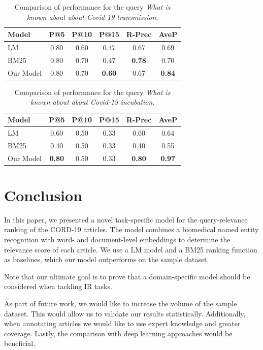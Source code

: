 \documentclass[10pt, a4paper]{article}
\begin{document}
	\begin{table}
		\caption{Comparison of performance for the query \textit{What is known about about Covid-19 transmission}.}
		\label{tab:query1}
		\begin{center}
			\begin{tabular}{lccccc}
				\toprule
				Model & P@5 & P@10 & P@15 & R-Prec & AveP \\
				\midrule
				LM & 0.80 & 0.60 & 0.47 & 0.67 & 0.69  \\
				BM25 & 0.80 & 0.70 & 0.47 & \textbf{0.78} & 0.70 \\
				Our Model & 0.80 & 0.70 & \textbf{0.60} & 0.67 & \textbf{0.84} \\
				\bottomrule
			\end{tabular}
		\end{center}
	\end{table}
	
	\begin{table}
		\caption{Comparison of performance for the query \textit{What is known about about Covid-19 incubation}.}
		\label{tab:query2}
		\begin{center}
			\begin{tabular}{lccccc}
				\toprule
				Model & P@5 & P@10 & P@15 & R-Prec & AveP \\
				\midrule
				LM & 0.60 & 0.50 & 0.33 & 0.60 & 0.64 \\
				BM25 & 0.40 & 0.50 & 0.33 & 0.40 & 0.55 \\
				Our Model & \textbf{0.80} & 0.50 & 0.33 & \textbf{0.80} & \textbf{0.97} \\
				\bottomrule
			\end{tabular}
		\end{center}
	\end{table}
	
	\section{Conclusion}
	
	In this paper, we presented a novel task-specific model for the query-relevance ranking of the CORD-19 articles. The model combines a biomedical named entity recognition with word- and document-level embeddings to determine the relevance score of each article. We use a LM model and a BM25 ranking function as baselines, which our model outperforms on the sample dataset.
	
	Note that our ultimate goal is to prove that a domain-specific model should be considered when tackling IR tasks.
	
	As part of future work, we would like to increase the volume of the sample dataset. This would allow us to validate our results statistically. Additionally, when annotating articles we would like to use expert knowledge and greater coverage. Lastly, the comparison with deep learning approaches would be beneficial.
	



\end{document}
